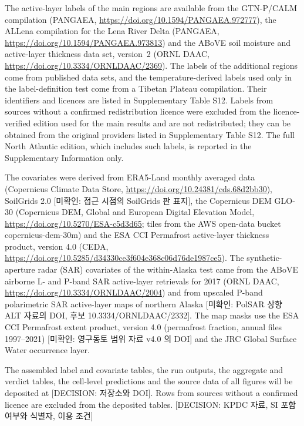 The active-layer labels of the main regions are available from the GTN-P/CALM compilation\cite{Streletskiy2025} (PANGAEA, \url{https://doi.org/10.1594/PANGAEA.972777}), the ALLena compilation for the Lena River Delta\cite{Veremeeva2025} (PANGAEA, \url{https://doi.org/10.1594/PANGAEA.973813}) and the ABoVE soil moisture and active-layer thickness data set, version~2\cite{Moore2025} (ORNL DAAC, \url{https://doi.org/10.3334/ORNLDAAC/2369}). The labels of the additional regions come from published data sets\cite{DuE2026,Grosse2007,Palmtag2022,Talucci2024,Pohl2026,Makarieva2017,Liang2023,Walker2009,Scheer2024,Martin2023,Boike2024,Hammar2025,Zastruzny2024,Sannel2020}, and the temperature-derived labels used only in the label-definition test come from a Tibetan Plateau compilation\cite{Fu2025}. Their identifiers and licences are listed in Supplementary Table S12. Labels from sources without a confirmed redistribution licence were excluded from the licence-verified edition used for the main results and are not redistributed; they can be obtained from the original providers listed in Supplementary Table S12. The full North Atlantic edition, which includes such labels, is reported in the Supplementary Information only.

The covariates were derived from ERA5-Land monthly averaged data\cite{munozsabater2021_era5_land} (Copernicus Climate Data Store, \url{https://doi.org/10.24381/cds.68d2bb30}), SoilGrids 2.0\cite{Poggio2021} [미확인: 접근 시점의 SoilGrids 판 표지], the Copernicus DEM GLO-30 (Copernicus DEM, Global and European Digital Elevation Model, \url{https://doi.org/10.5270/ESA-c5d3d65}; tiles from the AWS open-data bucket copernicus-dem-30m) and the ESA CCI Permafrost active-layer thickness product, version 4.0\cite{Westermann2024} (CEDA, \url{https://doi.org/10.5285/d34330ce3f604e368c06d76de1987ce5}). The synthetic-aperture radar (SAR) covariates of the within-Alaska test came from the ABoVE airborne L- and P-band SAR active-layer retrievals for 2017 (ORNL DAAC, \url{https://doi.org/10.3334/ORNLDAAC/2004}) and from upscaled P-band polarimetric SAR active-layer maps of northern Alaska\cite{Whitcomb2024} [미확인: PolSAR 상향 ALT 자료의 DOI, 후보 10.3334/ORNLDAAC/2332]. The map masks use the ESA CCI Permafrost extent product, version 4.0 (permafrost fraction, annual files 1997--2021) [미확인: 영구동토 범위 자료 v4.0 의 DOI] and the JRC Global Surface Water occurrence layer\cite{Pekel2016}.

The assembled label and covariate tables, the run outputs, the aggregate and verdict tables, the cell-level predictions and the source data of all figures will be deposited at [DECISION: 저장소와 DOI]. Rows from sources without a confirmed licence are excluded from the deposited tables. [DECISION: KPDC 자료, SI 포함 여부와 식별자, 이용 조건]

